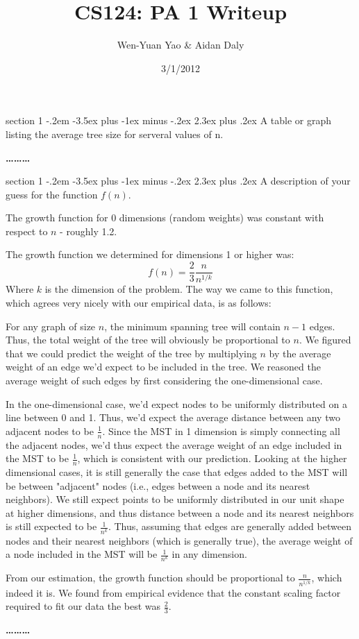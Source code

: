 \documentclass[12pt]{article}
\makeatletter
\newenvironment{problem}{\@startsection
       {section}
       {1}
       {-.2em}
       {-3.5ex plus -1ex minus -.2ex}
       {2.3ex plus .2ex}
       {\pagebreak[3]%
       \large\bf\noindent{Problem }
       }
       }
       {%
       \begin{center}\large\bf \ldots\ldots\ldots\end{center}}
\makeatother
\begin{document}
\title{CS124: PA 1 Writeup}
\author{Wen-Yuan Yao & Aidan Daly}
\date{3/1/2012}
\thispagestyle{empty}

\begin{problem}{}
A table or graph listing the average tree size for serveral values of n.

\end{problem}

\begin{problem}{}
A description of your guess for the function $f(n)$.

The growth function for 0 dimensions (random weights) was constant with respect to $n$ - roughly 1.2.

The growth function we determined for dimensions 1 or higher was:
\begin{equation}
f(n) = \frac{2}{3}\frac{n}{n^{1/k}}
\end{equation}
Where $k$ is the dimension of the problem.  The way we came to this function, which agrees very nicely with our empirical data, is as follows:

For any graph of size $n$, the minimum spanning tree will contain $n-1$ edges.  Thus, the total weight of the tree will obviously be proportional to $n$.  We figured that we could predict the weight of the tree by multiplying $n$ by the average weight of an edge we'd expect to be included in the tree.  We reasoned the average weight of such edges by first considering the one-dimensional case.

In the one-dimensional case, we'd expect nodes to be uniformly distributed on a line between 0 and 1.  Thus, we'd expect the average distance between any two adjacent nodes to be $\frac{1}{n}$.  Since the MST in 1 dimension is simply connecting all the adjacent nodes, we'd thus expect the average weight of an edge included in the MST to be $\frac{1}{n}$, which is consistent with our prediction.  Looking at the higher dimensional cases, it is still generally the case that edges added to the MST will be between "adjacent" nodes (i.e., edges between a node and its nearest neighbors).  We still expect points to be uniformly distributed in our unit shape at higher dimensions, and thus distance between a node and its nearest neighbors is still expected to be $\frac{1}{n^k}$.  Thus, assuming that edges are generally added between nodes and their nearest neighbors (which is generally true), the average weight of a node included in the MST will be $\frac{1}{n^k}$ in any dimension.

From our estimation, the growth function should be proportional to $\frac{n}{n^{1/k}}$, which indeed it is.  We found from empirical evidence that the constant scaling factor required to fit our data the best was $\frac{2}{3}$.


\end{problem}
\end{document}
